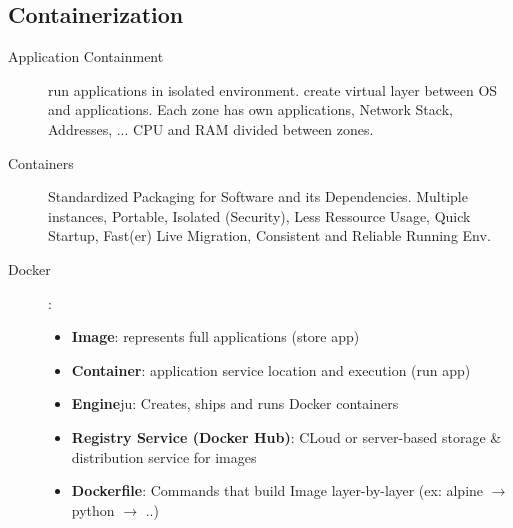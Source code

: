 \subsection*{Containerization}
\begin{description}
    \item[Application Containment]run applications in isolated environment. create virtual layer between OS and applications. Each zone has own applications, Network Stack, Addresses, ... CPU and RAM divided between zones.
    \item[Containers]Standardized Packaging for Software and its Dependencies. Multiple instances, Portable, Isolated (Security), Less Ressource Usage, Quick Startup, Fast(er) Live Migration, Consistent and Reliable Running Env.
    \item[Docker]: %
        \begin{itemize}[label={}, labelsep=0pt]
            \item \textbf{Image}: represents full applications (store app)
            \item \textbf{Container}: application service location and execution (run app)
            \item \textbf{Engine}ju: Creates, ships and runs Docker containers
            \item \textbf{Registry Service (Docker Hub)}: CLoud or server-based storage \& distribution service for images
            \item \textbf{Dockerfile}: Commands that build Image layer-by-layer (ex: alpine $\rightarrow$ python $\rightarrow$ ..)
        \end{itemize}
\end{description}

